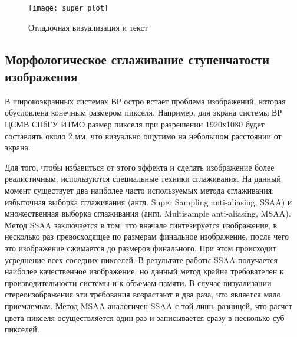 \begin{figure}[ht]
\begin{center}
\texttt{[image: super\_plot]}
\end{center}
\caption{Отладочная визуализация и текст}
\label{super_plot}
\end{figure}

%

\subsection{Морфологическое сглаживание ступенчатости изображения}
В широкоэкранных системах ВР остро встает проблема  изображений, которая обусловлена конечным размером пикселя. Например, для экрана системы ВР ЦСМВ СПбГУ ИТМО размер пикселя при разрешении 1920х1080 будет составлять около 2 мм, что визуально ощутимо на небольшом расстоянии от экрана. 

Для того, чтобы избавиться от этого эффекта и сделать изображение более реалистичным, используются специальные техники сглаживания.
На данный момент существует два наиболее часто используемых метода сглаживания: избыточная выборка сглаживания (англ. Super Sampling anti-aliasing, SSAA) и множественная выборка сглаживания (англ. Multisample anti-aliasing, MSAA). Метод SSAA заключается в том, что вначале синтезируется изображение, в несколько раз превосходящее по размерам финальное изображение, после чего это изображение сжимается до размеров финального. При этом происходит усреднение всех соседних пикселей. В результате работы SSAA получается наиболее качественное изображение, но данный метод крайне требователен к производительности системы и к объемам памяти. В случае визуализации стереоизображения эти требования возрастают в два раза, что является мало приемлемым. Метод MSAA аналогичен SSAA с той лишь разницей, что расчет цвета пикселя осуществляется один раз и записывается сразу в несколько суб-пикселей.

